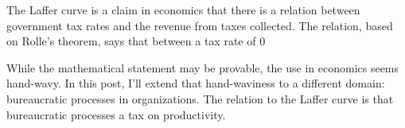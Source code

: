 
The Laffer curve is a claim in economics that there is a relation between government tax rates and the revenue from taxes collected. The relation, based on Rolle's theorem, says that between a tax rate of 0%

While the mathematical statement may be provable, the use in economics seems hand-wavy. In this post, I'll extend that hand-waviness to a different domain: bureaucratic processes in organizations. The relation to the Laffer curve is that bureaucratic processes a tax on productivity. 